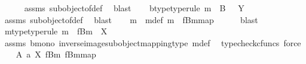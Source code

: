 \begin{isabellebody}
\ \ \ \ \isamarkupfalse%
\ assms{\isacharparenleft}{\kern0pt}{}{\isacharparenright}{\kern0pt}\ subobject{\isacharunderscore}{\kern0pt}of{\isacharunderscore}{\kern0pt}def{}\ \isamarkupfalse%
\ blast\isanewline
\ \ \isamarkupfalse%
\ b{\isacharunderscore}{\kern0pt}type{\isacharbrackleft}{\kern0pt}type{\isacharunderscore}{\kern0pt}rule{\isacharbrackright}{\kern0pt}{\isacharcolon}{\kern0pt}\ {\isachardoublequoteopen}m\ {\isacharcolon}{\kern0pt}\ B\ \ {\isasymrightarrow}\ Y{\isachardoublequoteclose}\isanewline
\ \ \ \ \isamarkupfalse%
\ assms{\isacharparenleft}{\kern0pt}{}{\isacharparenright}{\kern0pt}\ subobject{\isacharunderscore}{\kern0pt}of{\isacharunderscore}{\kern0pt}def{}\ \isamarkupfalse%
\ blast\isanewline
\ \ \isamarkupfalse%
\ m{\isacharprime}{\kern0pt}\ \ m{\isacharprime}{\kern0pt}{\isacharunderscore}{\kern0pt}def{\isacharcolon}{\kern0pt}\ {\isachardoublequoteopen}m{\isacharprime}{\kern0pt}\ {\isacharequal}{\kern0pt}\ {\isacharbrackleft}{\kern0pt}f\isactrlsup {\isacharminus}{\kern0pt}B{\isasymrparr}\isactrlbsub m\isactrlesub {\isacharbrackright}{\kern0pt}map{\isachardoublequoteclose}\isanewline
\ \ \ \ \isamarkupfalse%
\ blast\isanewline
\ \ \isamarkupfalse%
\ \isamarkupfalse%
\ m{\isacharprime}{\kern0pt}{\isacharunderscore}{\kern0pt}type{\isacharbrackleft}{\kern0pt}type{\isacharunderscore}{\kern0pt}rule{\isacharbrackright}{\kern0pt}{\isacharcolon}{\kern0pt}\ {\isachardoublequoteopen}m{\isacharprime}{\kern0pt}\ {\isacharcolon}{\kern0pt}\ f\isactrlsup {\isacharminus}{\kern0pt}B{\isasymrparr}\isactrlbsub m\isactrlesub \ {\isasymrightarrow}\ X{\isachardoublequoteclose}\isanewline
\ \ \ \ \isamarkupfalse%
\ assms{\isacharparenleft}{\kern0pt}{}{\isacharparenright}{\kern0pt}\ b{\isacharunderscore}{\kern0pt}mono\ inverse{\isacharunderscore}{\kern0pt}image{\isacharunderscore}{\kern0pt}subobject{\isacharunderscore}{\kern0pt}mapping{\isacharunderscore}{\kern0pt}type\ m{\isacharprime}{\kern0pt}{\isacharunderscore}{\kern0pt}def\ \isamarkupfalse%
\ {\isacharparenleft}{\kern0pt}typecheck{\isacharunderscore}{\kern0pt}cfuncs{\isacharcomma}{\kern0pt}\ force{\isacharparenright}{\kern0pt}\isanewline
\isanewline
\ \ \isamarkupfalse%
\ {\isachardoublequoteopen}{\isacharparenleft}{\kern0pt}A{\isacharcomma}{\kern0pt}\ a{\isacharparenright}{\kern0pt}\ {\isasymsubseteq}\isactrlbsub X\isactrlesub \ {\isacharparenleft}{\kern0pt}f\isactrlsup {\isacharminus}{\kern0pt}B{\isasymrparr}\isactrlbsub m\isactrlesub {\isacharcomma}{\kern0pt}\ {\isacharbrackleft}{\kern0pt}f\isactrlsup {\isacharminus}{\kern0pt}B{\isasymrparr}\isactrlbsub m\isactrlesub {\isacharbrackright}{\kern0pt}map{\isacharparenright}{\kern0pt}{\isachardoublequoteclose}\isanewline

\end{isabellebody}
